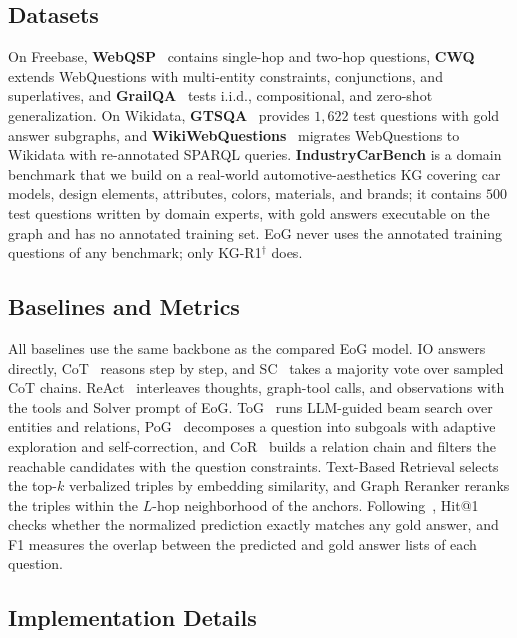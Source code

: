 \subsection{Datasets}
\label{app:datasets}
On Freebase, \textbf{WebQSP}~\citep{webqsp} contains single-hop and two-hop questions, \textbf{CWQ}~\citep{cwq} extends WebQuestions with multi-entity constraints, conjunctions, and superlatives, and \textbf{GrailQA}~\citep{grailqa} tests i.i.d., compositional, and zero-shot generalization. On Wikidata, \textbf{GTSQA}~\citep{GTSQA} provides $1{,}622$ test questions with gold answer subgraphs, and \textbf{WikiWebQuestions}~\citep{wikiwebquestions} migrates WebQuestions to Wikidata with re-annotated SPARQL queries. \textbf{IndustryCarBench} is a domain benchmark that we build on a real-world automotive-aesthetics KG covering car models, design elements, attributes, colors, materials, and brands; it contains $500$ test questions written by domain experts, with gold answers executable on the graph and has no annotated training set. EoG never uses the annotated training questions of any benchmark; only KG-R1$^\dagger$ does.

\subsection{Baselines and Metrics}
\label{app:baselines}
\label{app:metrics}
All baselines use the same backbone as the compared EoG model. IO answers directly, CoT~\citep{CoT} reasons step by step, and SC~\citep{Self-Consistency} takes a majority vote over sampled CoT chains. ReAct~\citep{React} interleaves thoughts, graph-tool calls, and observations with the tools and Solver prompt of EoG. ToG~\citep{ToG} runs LLM-guided beam search over entities and relations, PoG~\citep{PoG} decomposes a question into subgoals with adaptive exploration and self-correction, and CoR~\citep{CoR} builds a relation chain and filters the reachable candidates with the question constraints. Text-Based Retrieval selects the top-$k$ verbalized triples by embedding similarity, and Graph Reranker reranks the triples within the $L$-hop neighborhood of the anchors. Following~\citep{ToG,PoG}, Hit@1 checks whether the normalized prediction exactly matches any gold answer, and F1 measures the overlap between the predicted and gold answer lists of each question.

\subsection{Implementation Details}
\label{app:training}

